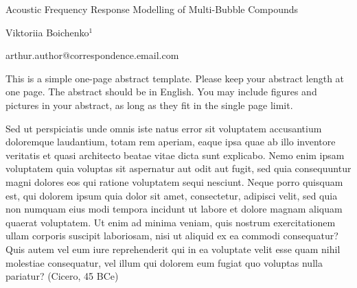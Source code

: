         
        
       


\Large
 \begin{center}
    Acoustic Frequency Response Modelling of Multi-Bubble Compounds

\hspace{10pt}

\large
Viktoriia Boichenko$^1$ \\

\hspace{10pt}

\small  
arthur.author@correspondence.email.com\\

\end{center}

\hspace{10pt}

\normalsize

This is a simple one-page abstract template. Please keep your abstract length at one page. The abstract should be in English. You may include figures and pictures in your abstract, as long as they fit in the single page limit.

Sed ut perspiciatis unde omnis iste natus error sit voluptatem accusantium doloremque laudantium, totam rem aperiam, eaque ipsa quae ab illo inventore veritatis et quasi architecto beatae vitae dicta sunt explicabo. Nemo enim ipsam voluptatem quia voluptas sit aspernatur aut odit aut fugit, sed quia consequuntur magni dolores eos qui ratione voluptatem sequi nesciunt. Neque porro quisquam est, qui dolorem ipsum quia dolor sit amet, consectetur, adipisci velit, sed quia non numquam eius modi tempora incidunt ut labore et dolore magnam aliquam quaerat voluptatem. Ut enim ad minima veniam, quis nostrum exercitationem ullam corporis suscipit laboriosam, nisi ut aliquid ex ea commodi consequatur? Quis autem vel eum iure reprehenderit qui in ea voluptate velit esse quam nihil molestiae consequatur, vel illum qui dolorem eum fugiat quo voluptas nulla pariatur? (Cicero, 45 BCe)